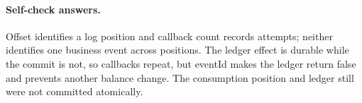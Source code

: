 \paragraph{Self-check answers.}Offset identifies a log position and callback count records attempts; neither identifies one business event across positions. The ledger effect is durable while the commit is not, so callbacks repeat, but eventId makes the ledger return false and prevents another balance change. The consumption position and ledger still were not committed atomically.
